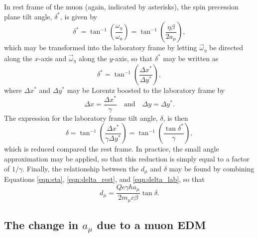In rest frame of the muon (again, indicated by asterisks), the spin precession plane tilt angle, $\delta^{*}$, is given by
%
\begin{equation} 
  \delta^{*} = \tan^{-1}\left(\frac{\omega_{\eta}}{\omega_{a}}\right) = \tan^{-1}\left(\frac{\eta\beta}{2a_{\mu}}\right), \label{eqn:delta_rest}
\end{equation}
%
which may be transformed into the laboratory frame by letting $\vec{\omega}_{\eta}$ be directed along the $x$-axis and $\vec{\omega}_{\eta}$ along the $y$-axis, so that $\delta^{*}$ may be written as 
%
\begin{equation} 
  \delta^{*} = \tan^{-1}\left(\frac{\Delta{x}^{*}}{\Delta{y}^{*}}\right),
\end{equation}
%
where $\Delta{x}^{*}$ and $\Delta{y}^{*}$ may be Lorentz boosted to the laboratory frame by
%
\begin{equation} 
  \Delta{x} = \frac{\Delta{x}^{*}}{\gamma} \quad \text{and} \quad \Delta{y} = \Delta{y}^{*}.
\end{equation}
%
The expression for the laboratory frame tilt angle, $\delta$, is then 
%
\begin{equation} 
  \delta = \tan^{-1}\left(\frac{\Delta{x}^{*}}{\gamma\Delta{y}^{*}}\right) = \tan^{-1}\left(\frac{\tan{\delta^{*}}}{\gamma}\right),
  \label{eqn:delta_lab}
\end{equation}
%
which is reduced compared the rest frame. In practice, the small angle approximation may be applied, so that this reduction is simply equal to a factor of $1/\gamma$. Finally, the relationship between the $d_{\mu}$ and $\delta$ may be found by combining Equations \ref{eqn:eta}, \ref{eqn:delta_rest}, and \ref{eqn:delta_lab}, so that
%
\begin{equation} 
  d_{\mu} = \frac{Qe\gamma\hbar a_{\mu}}{2m_{\mu}c\beta}\tan{\delta}.
  \label{eqn:EDMFromAngle}
\end{equation}
%
\subsection{The change in $a_{\mu}$ due to a muon EDM}\label{subsec:amuEDM}

